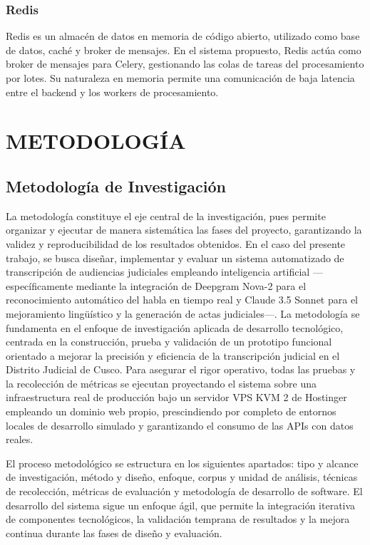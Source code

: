\documentclass[12pt,a4paper,oneside]{report}
\begin{document}
\subsection{Redis}

Redis es un almacén de datos en memoria de código abierto, utilizado como base de datos, caché y broker de mensajes. En el sistema propuesto, Redis actúa como broker de mensajes para Celery, gestionando las colas de tareas del procesamiento por lotes. Su naturaleza en memoria permite una comunicación de baja latencia entre el backend y los workers de procesamiento.

\chapter{METODOLOGÍA}

\section{Metodología de Investigación}

La metodología constituye el eje central de la investigación, pues permite organizar y ejecutar de manera sistemática las fases del proyecto, garantizando la validez y reproducibilidad de los resultados obtenidos. En el caso del presente trabajo, se busca diseñar, implementar y evaluar un sistema automatizado de transcripción de audiencias judiciales empleando inteligencia artificial ---específicamente mediante la integración de Deepgram Nova-2 para el reconocimiento automático del habla en tiempo real y Claude 3.5 Sonnet para el mejoramiento lingüístico y la generación de actas judiciales---. La metodología se fundamenta en el enfoque de investigación aplicada de desarrollo tecnológico, centrada en la construcción, prueba y validación de un prototipo funcional orientado a mejorar la precisión y eficiencia de la transcripción judicial en el Distrito Judicial de Cusco. Para asegurar el rigor operativo, todas las pruebas y la recolección de métricas se ejecutan proyectando el sistema sobre una infraestructura real de producción bajo un servidor VPS KVM 2 de Hostinger empleando un dominio web propio, prescindiendo por completo de entornos locales de desarrollo simulado y garantizando el consumo de las APIs con datos reales.

El proceso metodológico se estructura en los siguientes apartados: tipo y alcance de investigación, método y diseño, enfoque, corpus y unidad de análisis, técnicas de recolección, métricas de evaluación y metodología de desarrollo de software. El desarrollo del sistema sigue un enfoque ágil, que permite la integración iterativa de componentes tecnológicos, la validación temprana de resultados y la mejora continua durante las fases de diseño y evaluación.
\end{document}
